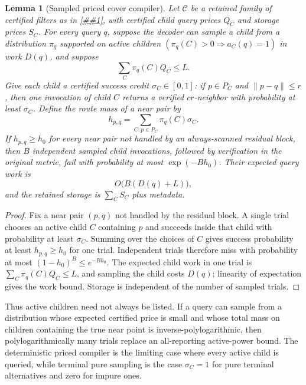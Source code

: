 \documentclass[10pt]{article}
\newcommand{\cref}[1]{\ref{##1}}
\newtheorem{lemma}[theorem]{Lemma}
\theoremstyle{definition}
\begin{document}
\begin{lemma}[Sampled priced cover compiler]
   \label{lem:sampled-priced-cover}
   Let $\mathcal C$ be a retained family of certified filters as in
   \cref{lem:priced-cover-compiler}, with certified child query prices $Q_C$
   and storage prices $S_C$.  For every query $q$, suppose the decoder can
   sample a child from a distribution $\pi_q$ supported on active children
   $(\pi_q(C)>0\Rightarrow a_C(q)=1)$ in work $D(q)$, and suppose
   \[
      \sum_C\pi_q(C)Q_C\le L .
   \]
   Give each child a certified success credit $\sigma_C\in[0,1]$: if
   $p\in P_C$ and $\|p-q\|\le r$, then one invocation of child $C$ returns a
   verified $cr$-neighbor with probability at least $\sigma_C$.  Define the
   route mass of a near pair by
   \[
      h_{p,q}
      =
      \sum_{C:p\in P_C}\pi_q(C)\sigma_C .
   \]
   If $h_{p,q}\ge h_0$ for every near pair not handled by an always-scanned
   residual block, then $B$ independent sampled child invocations, followed by
   verification in the original metric, fail with probability at most
   $\exp(-Bh_0)$.  Their expected query work is
   \[
      O\bigl(B(D(q)+L)\bigr),
   \]
   and the retained storage is $\sum_CS_C$ plus metadata.
\end{lemma}

\begin{proof}
   Fix a near pair $(p,q)$ not handled by the residual block.  A single trial
   chooses an active child $C$ containing $p$ and succeeds inside that child
   with probability at least $\sigma_C$.  Summing over the choices of $C$ gives
   success probability at least $h_{p,q}\ge h_0$ for one trial.  Independent
   trials therefore miss with probability at most $(1-h_0)^B\le e^{-Bh_0}$.
   The expected child work in one trial is
   $\sum_C\pi_q(C)Q_C\le L$, and sampling the child costs $D(q)$; linearity of
   expectation gives the work bound.  Storage is independent of the number of
   sampled trials.
\end{proof}

Thus active children need not always be listed.  If a query can sample from a
distribution whose expected certified price is small and whose total mass on
children containing the true near point is inverse-polylogarithmic, then
polylogarithmically many trials replace an all-reporting active-power bound.
The deterministic priced compiler is the limiting case where every active child
is queried, while terminal pure sampling is the case $\sigma_C=1$ for pure
terminal alternatives and zero for impure ones.
\end{document}
